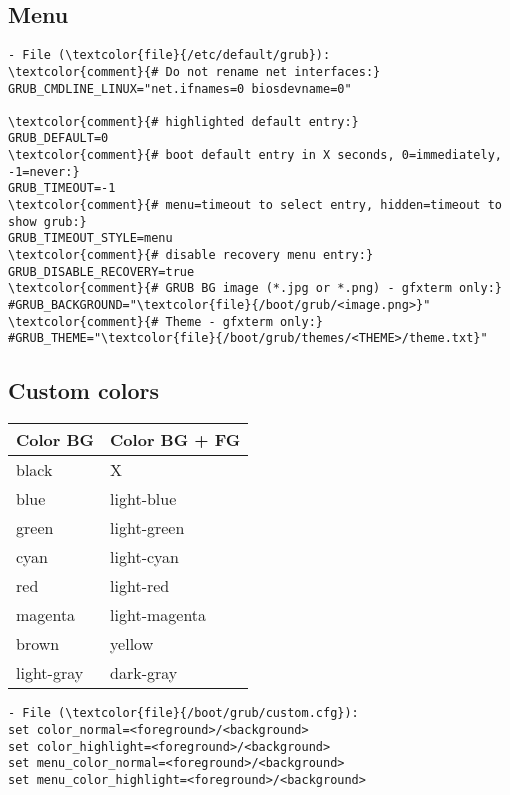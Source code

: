 \documentclass[10pt, a4paper, onecolumn, openany]{book} %
\begin{document}
\subsection{Menu}
\begin{Verbatim}[commandchars=\\\{\}]
- File (\textcolor{file}{/etc/default/grub}):
\textcolor{comment}{# Do not rename net interfaces:}
GRUB_CMDLINE_LINUX="net.ifnames=0 biosdevname=0"

\textcolor{comment}{# highlighted default entry:}
GRUB_DEFAULT=0
\textcolor{comment}{# boot default entry in X seconds, 0=immediately, -1=never:}
GRUB_TIMEOUT=-1
\textcolor{comment}{# menu=timeout to select entry, hidden=timeout to show grub:}
GRUB_TIMEOUT_STYLE=menu
\textcolor{comment}{# disable recovery menu entry:}
GRUB_DISABLE_RECOVERY=true
\textcolor{comment}{# GRUB BG image (*.jpg or *.png) - gfxterm only:}
#GRUB_BACKGROUND="\textcolor{file}{/boot/grub/<image.png>}"
\textcolor{comment}{# Theme - gfxterm only:}
#GRUB_THEME="\textcolor{file}{/boot/grub/themes/<THEME>/theme.txt}"
\end{Verbatim}
\subsection{Custom colors}
\begin{center}
    \begin{small}
    \begin{tabular}{|p{4cm}|p{4cm}|}
    \hline
    \textbf{Color BG} & \textbf{Color BG + FG} \\
    \hline
    black & X \\
    \hline
    blue & light-blue \\
    \hline
    green & light-green \\
    \hline
    cyan & light-cyan \\
    \hline
    red & light-red \\
    \hline
    magenta & light-magenta \\
    \hline
    brown & yellow \\
    \hline
    light-gray & dark-gray  \\
    \hline
    \end{tabular}
    \end{small}
\end{center}
\begin{Verbatim}[commandchars=\\\{\}]
- File (\textcolor{file}{/boot/grub/custom.cfg}):
set color_normal=<foreground>/<background>
set color_highlight=<foreground>/<background>
set menu_color_normal=<foreground>/<background>
set menu_color_highlight=<foreground>/<background>
\end{Verbatim}
\end{document}
